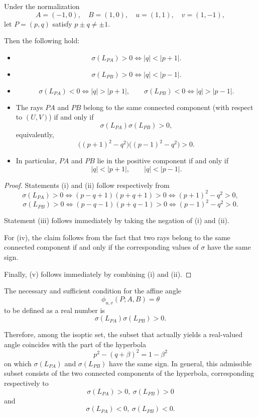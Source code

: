 \documentclass[12pt]{article}
\begin{document}
\begin{proposition}
\label{prop:same-component-PA-PB}
Under the normalization
\[
A=(-1,0),\quad B=(1,0),\quad u=(1,1),\quad v=(1,-1),
\]
let $P=(p,q)$ satisfy $p\pm q\neq \pm1$.

Then the following hold:
\begin{itemize}
\item[(i)]
\[
\sigma(L_{PA})>0 \iff |q|<|p+1|.
\]

\item[(ii)]
\[
\sigma(L_{PB})>0 \iff |q|<|p-1|.
\]

\item[(iii)]
\[
\sigma(L_{PA})<0 \iff |q|>|p+1|,\qquad
\sigma(L_{PB})<0 \iff |q|>|p-1|.
\]

\item[(iv)]
The rays $PA$ and $PB$ belong to the same connected component
(with respect to $(U,V)$) if and only if
\[
\sigma(L_{PA})\sigma(L_{PB})>0,
\]
equivalently,
\[
\bigl((p+1)^2-q^2\bigr)\bigl((p-1)^2-q^2\bigr)>0.
\]

\item[(v)]
In particular, $PA$ and $PB$ lie in the positive component if and only if
\[
|q|<|p+1|,\qquad |q|<|p-1|.
\]
\end{itemize}
\end{proposition}

\begin{proof}
Statements (i) and (ii) follow respectively from
\[
\sigma(L_{PA})>0 \iff (p-q+1)(p+q+1)>0 \iff (p+1)^2-q^2>0,
\]
\[
\sigma(L_{PB})>0 \iff (p-q-1)(p+q-1)>0 \iff (p-1)^2-q^2>0.
\]

Statement (iii) follows immediately by taking the negation of (i) and (ii).

For (iv), the claim follows from the fact that two rays belong to the same connected component
if and only if the corresponding values of $\sigma$ have the same sign.

Finally, (v) follows immediately by combining (i) and (ii).
\end{proof}

\begin{proposition}\label{prop:isoptic-branch}
The necessary and sufficient condition for the affine angle
\[
\phi_{u,v}(P;A,B)=\theta
\]
to be defined as a real number is
\[
\sigma(L_{PA})\sigma(L_{PB})>0.
\]

Therefore, among the isoptic set, the subset that actually yields a real-valued angle
coincides with the part of the hyperbola
\[
p^2-(q+\beta)^2=1-\beta^2
\]
on which $\sigma(L_{PA})$ and $\sigma(L_{PB})$ have the same sign.
In general, this admissible subset consists of the two connected components of the hyperbola,
corresponding respectively to
\[
\sigma(L_{PA})>0,\ \sigma(L_{PB})>0
\]
and
\[
\sigma(L_{PA})<0,\ \sigma(L_{PB})<0.
\]
\end{proposition}
\end{document}
